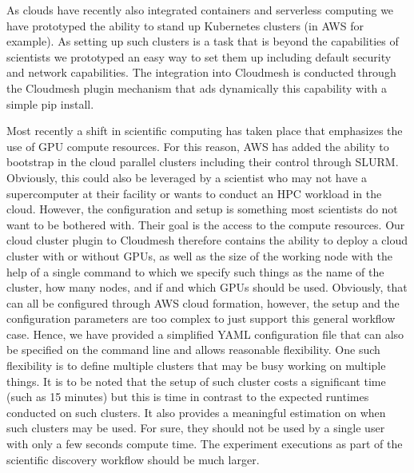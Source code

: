 As clouds have recently also integrated containers and serverless computing we have prototyped the ability to stand up Kubernetes clusters (in AWS for example). As setting up such clusters is a task that is beyond the capabilities of scientists we prototyped an easy way to set them up including default security and network capabilities. The integration into Cloudmesh is conducted through the Cloudmesh plugin mechanism that ads dynamically this capability with a simple pip install.

Most recently a shift in scientific computing has taken place that emphasizes the use of GPU compute resources. For this reason, AWS has added the ability to bootstrap in the cloud parallel clusters including their control through SLURM. Obviously, this could also be leveraged by a scientist who may not have a supercomputer at their facility or wants to conduct an HPC workload in the cloud. However, the configuration and setup is something most scientists do not want to be bothered with. Their goal is the access to the compute resources. Our cloud cluster plugin to Cloudmesh therefore contains the ability to deploy a cloud cluster with or without GPUs, as well as the size of the working node with the help of a single command to which we specify such things as the name of the cluster, how many nodes, and if and which GPUs should be used. Obviously, that can all be configured through AWS cloud formation, however, the setup and the configuration parameters are too complex to just support this general workflow case. Hence, we have provided a simplified YAML configuration file that can also be specified on the command line and allows reasonable flexibility. One such flexibility is to define multiple clusters that may be busy working on multiple things. It is to be noted that the setup of such cluster costs a significant time (such as 15 minutes) but this is time in contrast to the expected runtimes conducted on such clusters. It also provides a meaningful estimation on when such clusters may be used. For sure, they should not be used by a single user with only a few seconds compute time.  The experiment executions as part of the scientific discovery workflow should be much larger.

